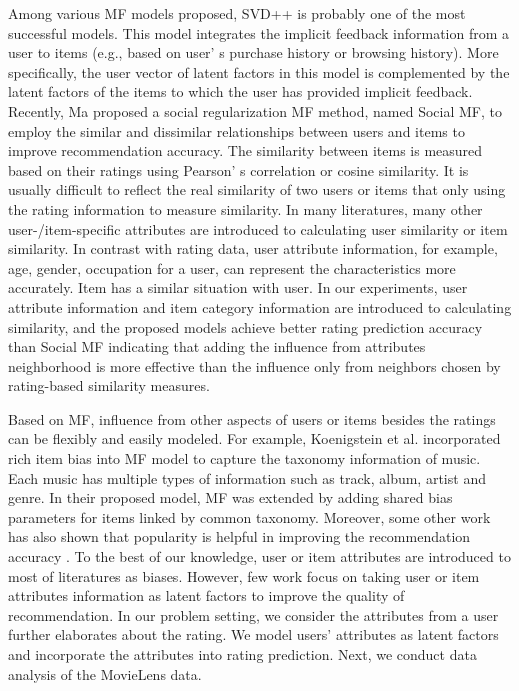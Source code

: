 \documentclass{llncs}
\begin{document}
	Among various MF models proposed, SVD++ \cite{KDD200801} is probably
	one of the most successful models. This model integrates the implicit feedback information from a user to items (e.g., based on
	user' s purchase history or browsing history). More specifically, the
	user vector of latent factors in this model is complemented by the
	latent factors of the items to which the user has provided implicit
	feedback. Recently, Ma \cite{SIGIR201301} proposed a social regularization MF
	method, named Social MF, to employ the similar and dissimilar
	relationships between users and items to improve recommendation accuracy. The similarity between items is measured based on
	their ratings using Pearson' s correlation or cosine similarity.
	It is usually difficult to reflect the real similarity of two users or items that only using the rating information to measure similarity.
	In many literatures, many other user-/item-specific attributes are introduced to calculating user similarity or item similarity.
	In contrast with rating data, user attribute information, for example,
	age, gender, occupation for a user, can represent the characteristics more accurately.
	Item has a similar situation with user.
	In our experiments, user attribute information and item category information are introduced to calculating similarity,
	and the proposed models achieve better rating prediction
	accuracy than Social MF \cite{SIGIR201301} indicating that adding the influence from attributes neighborhood is more effective than the influence only from
	neighbors chosen by rating-based similarity measures.
	
	Based on MF, influence from other aspects of users or items besides the ratings can be flexibly and easily modeled. For example,
	Koenigstein et al. \cite{bias} incorporated rich item bias into MF model to
	capture the taxonomy information of music. Each music has multiple types of information such as track, album, artist and genre. In
	their proposed model, MF was extended by adding shared bias parameters for items linked by common taxonomy. Moreover, some
	other work has also shown that popularity is helpful in improving
	the recommendation accuracy \cite{popular1,popular2}.
	To the best of our knowledge, user or item attributes are introduced to most of literatures as biases.
	However, few work focus on taking user or item attributes information as latent factors to
	improve the quality of recommendation.
	In our problem setting, we consider the attributes from a user
	further elaborates about the rating. We model users' attributes
	as latent factors and incorporate the attributes into rating prediction.
	Next, we conduct data analysis of the MovieLens data.
\end{document}
